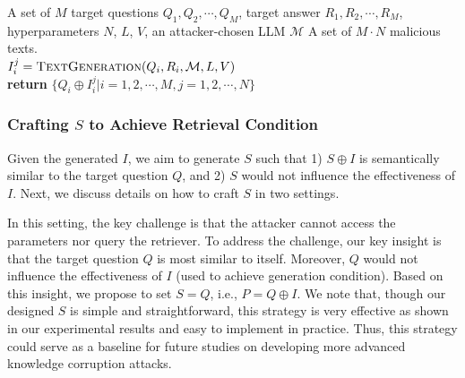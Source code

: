 \begin{algorithm}[!t]
   \caption{\emph{{\name} (black-box)}}
   \label{alg:poisonedrag-blackbox}
\begin{algorithmic}
    A set of $M$ target questions $Q_1, Q_2, \cdots, Q_M$, target answer $R_1, R_2, \cdots, R_M$, hyperparameters $N$, $L$, $V$,  an attacker-chosen LLM $\mathcal{M}$
    A set of $M \cdot N$ malicious texts. \\
    \STATE $I_i^j = \textsc{TextGeneration}(Q_i, R_i, \mathcal{M}, L, V)$ \\
    \ENDFOR
    \ENDFOR
   \STATE \textbf{return} $\{Q_i \oplus I_i^j| i=1,2,\cdots, M, j=1,2,\cdots, N\}$
\end{algorithmic}
\end{algorithm}




\subsubsection{Crafting $S$ to Achieve Retrieval Condition} 
\vspace{-2mm}
Given the generated $I$, we aim to generate $S$ such that 1) $S \oplus I$ is semantically similar to the target question $Q$, and 2) $S$ would not influence the effectiveness of $I$. Next, we discuss details on how to craft $S$ in two settings.



In this setting, the key challenge is that the attacker cannot access the parameters nor query the retriever. To address the challenge, our key insight is that the target question $Q$ is most similar to itself. Moreover, $Q$ would not influence the effectiveness of $I$ (used to achieve generation condition). Based on this insight, we propose to set $S=Q$, i.e., $P=Q \oplus I$. We note that, though
our designed  $S$  
is simple and straightforward, this strategy is very effective as shown in our experimental results and easy  to implement in practice. 
Thus, this strategy could serve as a baseline for future studies on developing more advanced knowledge corruption attacks. 



